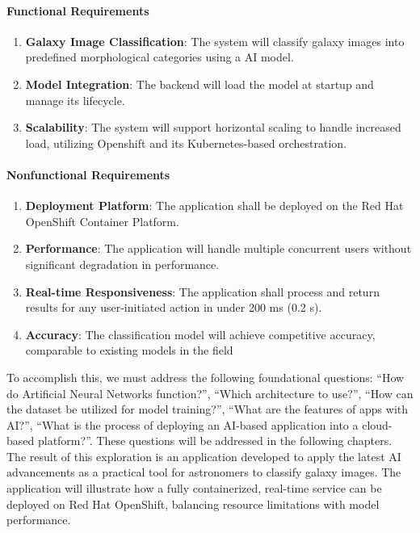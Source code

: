 \paragraph{Functional Requirements}

\begin{enumerate}
    \item \textbf{Galaxy Image Classification}: The system will classify galaxy images into predefined morphological categories using a AI model.
    \item \textbf{Model Integration}: The backend will load the model at startup and manage its lifecycle.
    \item \textbf{Scalability}: The system will support horizontal scaling to handle increased load, utilizing Openshift and its Kubernetes-based orchestration.
\end{enumerate}

\paragraph{Nonfunctional Requirements}

\begin{enumerate}
    \item \textbf{Deployment Platform}: The application shall be deployed on the Red Hat OpenShift Container Platform.
    \item \textbf{Performance}: The application will handle multiple concurrent users without significant degradation in performance.
    \item \textbf{Real-time Responsiveness}: The application shall process and return results for any user-initiated action in under 200 ms (0.2 s).
    \item \textbf{Accuracy}: The classification model will achieve competitive accuracy, comparable to existing models in the field
\end{enumerate}

To accomplish this, we must address the following foundational questions: \enquote{How do Artificial Neural Networks function?}, \enquote{Which architecture to use?}, \enquote{How can the dataset be utilized for model training?}, \enquote{What are the features of apps with AI?}, \enquote{What is the process of deploying an AI-based application into a cloud-based platform?}. These questions will be addressed in the following chapters. The result of this exploration is an application developed to apply the latest AI advancements as a practical tool for astronomers to classify galaxy images. The application will illustrate how a fully containerized, real-time service can be deployed on Red Hat OpenShift, balancing resource limitations with model performance.

